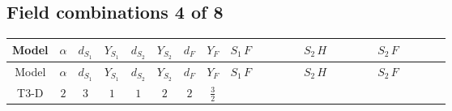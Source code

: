 \documentclass[8pt]{article}
\begin{document}
\begin{landscape}
\subsection*{Field combinations 4 of 8}
\begin{longtable}{@{}cccccccc >{\raggedright\arraybackslash}p{0.21\linewidth} >{\raggedright\arraybackslash}p{0.21\linewidth} >{\raggedright\arraybackslash}p{0.21\linewidth}@{}}
\toprule
Model & $\alpha$ & $d_{S_1}$ & $Y_{S_1}$ & $d_{S_2}$ & $Y_{S_2}$ & $d_F$ & $Y_F$ & $S_1\,F$ & $S_2\,H$ & $S_2\,F$ \\
\midrule
\endfirsthead
\toprule
Model & $\alpha$ & $d_{S_1}$ & $Y_{S_1}$ & $d_{S_2}$ & $Y_{S_2}$ & $d_F$ & $Y_F$ & $S_1\,F$ & $S_2\,H$ & $S_2\,F$ \\
\midrule
\endhead
T3-D & $2$ & $3$ & $1$ & $1$ & $2$ & $2$ & $\frac{3}{2}$ & \scriptsize\adjustbox{max width=\linewidth}{$\begin{gathered} +\frac{2}{3} \hbar  \log \left(\frac{\bar{\mu}^{2}}{M_F^2}\right) \overline{y_{1,i_1,r_1}} \overline{y_{1,i_2,r_2}} S_{1,j_2}^2 y_{1,i_1,r_2} y_{1,i_2,r_1} \left(S_{1,j_1}{}^{\dagger }\right){}^2 \\ +\frac{2 C_{S_1^\dagger S_1} \hbar  \log \left(\frac{\bar{\mu}^{2}}{M_F^2}\right) \overline{y_{1,i_1,r_1}} S_{1,j_1} y_{1,i_1,r_1} S_{1,j_1}{}^{\dagger }}{\sqrt{3}} \\ -\frac{4}{3} \hbar  \log \left(\frac{\bar{\mu}^{2}}{M_F^2}\right) \overline{y_{1,i_1,r_1}} \overline{y_{1,i_2,r_2}} S_{1,j_1} S_{1,j_2} y_{1,i_1,r_2} y_{1,i_2,r_1} S_{1,j_1}{}^{\dagger } S_{1,j_2}{}^{\dagger }\end{gathered}$} & \scriptsize\adjustbox{max width=\linewidth}{$\begin{gathered} -\frac{2 \hbar  \overline{y_{2,i_1,r_1}} \overline{Y_{e,i_2,i_3}} H_{a_1} S_2 y_{2,i_2,r_1} Y_{e,i_1,i_3} H_{a_1}{}^{\dagger } S_2{}^{\dagger }}{\epsilon } \\ -2 \hbar  \overline{y_{2,i_1,r_1}} \overline{Y_{e,i_2,i_3}} H_{a_1} S_2 y_{2,i_2,r_1} Y_{e,i_1,i_3} H_{a_1}{}^{\dagger } S_2{}^{\dagger } \\ +H_{a_2} S_2 H_{a_1}{}^{\dagger } S_2{}^{\dagger } \mathcal{I}_{H2,a_1,a_2}{}^1 \lambda_{HS_2}^{(1)}^{(1)}\end{gathered}$} & \scriptsize\adjustbox{max width=\linewidth}{$\begin{gathered} -2 \hbar  \log \left(\frac{\bar{\mu}^{2}}{M_F^2}\right) \overline{y_{2,i_1,r_1}} \overline{y_{2,i_2,r_2}} S_2^2 y_{2,i_1,r_2} y_{2,i_2,r_1} \left(S_2{}^{\dagger }\right){}^2 \\ +2 C_{S_2^\dagger S_2} \hbar  \log \left(\frac{\bar{\mu}^{2}}{M_F^2}\right) \overline{y_{2,i_1,r_1}} S_2 y_{2,i_1,r_1} S_2{}^{\dagger } \\ -2 \hbar  \log \left(\frac{\bar{\mu}^{2}}{M_F^2}\right) \overline{y_{2,i_1,r_1}} S_2^2 y_{2,i_1,r_1} \left(S_2{}^{\dagger }\right){}^2 \lambda_{S_2}^{(1)}^{(1)}\end{gathered}$} \\

\end{longtable}
\end{landscape}
\end{document}
